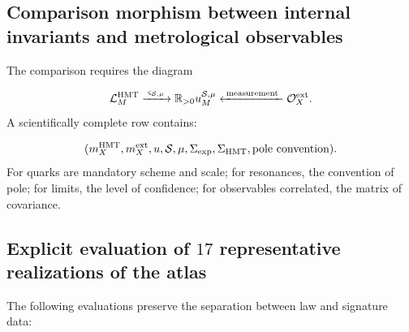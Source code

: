 \subsection{Comparison morphism between internal invariants and metrological observables}
The comparison requires the diagram

\[
 \mathcal L_M^{\rm HMT}
 \xrightarrow{\;\varsigma_{\mathcal S,\mu}\;}
 \mathbb R_{>0}u_M^{\mathcal S,\mu}
 \xleftarrow{\;\text{measurement}\;}
 \mathcal O_X^{\rm ext}.
\]
A scientifically complete row contains:

\[
 (m_X^{\rm HMT},m_X^{\rm ext},
 u,\mathcal S,\mu,\Sigma_{\rm exp},\Sigma_{\rm HMT},
 \text{pole convention}).
\]
For quarks are mandatory scheme and scale; for resonances, the convention of pole; for limits, the level of confidence; for observables correlated, the matrix of covariance.

\subsection{Explicit evaluation of \(17\) representative realizations of the atlas}
The following evaluations preserve the separation between law and signature data:

